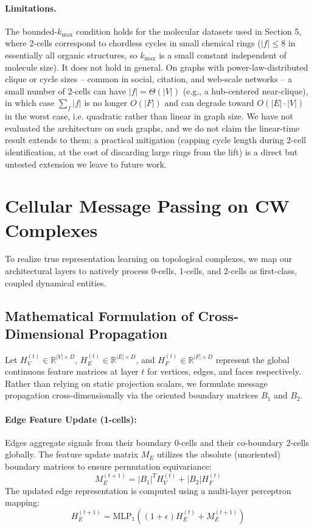 \documentclass[11pt, letterpaper]{article}
\begin{document}
\paragraph{Limitations.} The bounded-$k_{\max}$ condition holds for the molecular datasets used in Section 5, where 2-cells correspond to chordless cycles in small chemical rings ($|f| \le 8$ in essentially all organic structures, so $k_{\max}$ is a small constant independent of molecule size). It does not hold in general. On graphs with power-law-distributed clique or cycle sizes -- common in social, citation, and web-scale networks -- a small number of 2-cells can have $|f| = \Theta(|V|)$ (e.g., a hub-centered near-clique), in which case $\sum_{f}|f|$ is no longer $O(|F|)$ and can degrade toward $O(|E| \cdot |V|)$ in the worst case, i.e. quadratic rather than linear in graph size. We have not evaluated the architecture on such graphs, and we do not claim the linear-time result extends to them; a practical mitigation (capping cycle length during 2-cell identification, at the cost of discarding large rings from the lift) is a direct but untested extension we leave to future work.

\section{Cellular Message Passing on CW Complexes}
To realize true representation learning on topological complexes, we map our architectural layers to natively process 0-cells, 1-cells, and 2-cells as first-class, coupled dynamical entities. 

\subsection{Mathematical Formulation of Cross-Dimensional Propagation}
Let $H_V^{(t)} \in \mathbb{R}^{|V| \times D}$, $H_E^{(t)} \in \mathbb{R}^{|E| \times D}$, and $H_F^{(t)} \in \mathbb{R}^{|F| \times D}$ represent the global continuous feature matrices at layer $t$ for vertices, edges, and faces respectively. Rather than relying on static projection scalars, we formulate message propagation cross-dimensionally via the oriented boundary matrices $B_1$ and $B_2$.

\paragraph{Edge Feature Update (1-cells):}
Edges aggregate signals from their boundary 0-cells and their co-boundary 2-cells globally. The feature update matrix $M_E$ utilizes the absolute (unoriented) boundary matrices to ensure permutation equivariance:
\begin{equation}
    M_E^{(t+1)} = |B_1|^T H_V^{(t)} + |B_2| H_F^{(t)}
\end{equation}
The updated edge representation is computed using a multi-layer perceptron mapping:
\begin{equation}
    H_E^{(t+1)} = \text{MLP}_1\left( (1 + \epsilon) H_E^{(t)} + M_E^{(t+1)} \right)
\end{equation}
\end{document}
